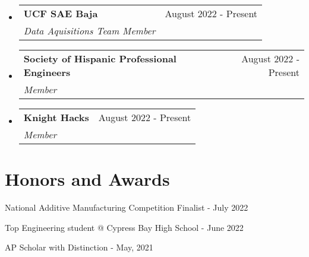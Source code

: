 \documentclass[a4paper,20pt]{article}
\makeatletter
\newcommand{\resumeSubheading}[4]{
  \vspace{-1pt}\item
    \begin{tabular*}{0.97\textwidth}{l@{\extracolsep{\fill}}r}
      \textbf{#1} & #2 \\
      \textit{#3} & \textit{#4} \\
    \end{tabular*}\vspace{-5pt}
}
\newcommand{\resumeSubHeadingListStart}{\begin{itemize}[leftmargin=*]}
\newcommand{\resumeSubHeadingListEnd}{\end{itemize}}
\makeatother
\begin{document}
\resumeSubHeadingListStart
\resumeSubheading{UCF SAE Baja}{August 2022 - Present}
{Data Aquisitions Team Member}{}
\resumeSubHeadingListEnd

\resumeSubHeadingListStart
\resumeSubheading{Society of Hispanic Professional Engineers}{August 2022 - Present}
{Member}{}
\resumeSubHeadingListEnd

\resumeSubHeadingListStart
\resumeSubheading{Knight Hacks}{August 2022 - Present}
{Member}{}
\resumeSubHeadingListEnd
\vspace{-5pt}
\section{Honors and Awards}
\begin{description}[font=$\bullet$]
\item {National Additive Manufacturing Competition Finalist - July 2022}
\vspace{-5pt}
\item {Top Engineering student @ Cypress Bay High School - June 2022 }
\vspace{-5pt}
\item {AP Scholar with Distinction - May, 2021}

\end{description}

\vspace{-5pt}
\end{document}
